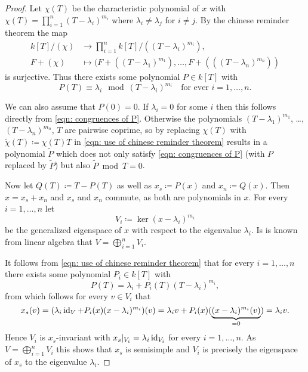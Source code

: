 \begin{proof}
 Let $\chi(T)$ be the characteristic polynomial of $x$ with $\chi(T) = \prod_{i=1}^n (T-\lambda_i)^{m_i}$ where $\lambda_i \neq \lambda_j$ for $i \neq j$. By the chinese reminder theorem the map
 \begin{equation}\label{eqn: use of chinese reminder theorem}
  \begin{aligned}
   k[T]/(\chi) &\longrightarrow \prod_{i=1}^n k[T]/((T-\lambda_i)^{m_i}),\\
   F + (\chi) &\longmapsto (F+((T-\lambda_1)^{m_1}), \dotsc, F+(((T-\lambda_n)^{m_n}))
  \end{aligned}
 \end{equation}
 is surjective. Thus there exists some polynomial $P \in k[T]$ with
 \begin{equation}\label{eqn: congruences of P}
  P(T) \equiv \lambda_i \mod (T-\lambda_i)^{m_i} \quad \text{for ever $i = 1, \dotsc, n$}.
 \end{equation}
 
 We can also assume that $P(0) = 0$. If $\lambda_i = 0$ for some $i$ then this follows directly from \eqref{eqn: congruences of P}. Otherwise the polynomials $(T-\lambda_1)^{m_1}$, \dots, $(T-\lambda_n)^{m_n}$, $T$ are pairwise coprime, so by replacing $\chi(T)$ with $\tilde{\chi}(T) \coloneqq \chi(T) T$ in \eqref{eqn: use of chinese reminder theorem} results in a polynomial $\tilde{P}$ which does not only satisfy \eqref{eqn: congruences of P} (with $P$ replaced by $\tilde{P}$) but also $\tilde{P} \bmod T = 0$.
 
 Now let $Q(T) \coloneqq T - P(T)$ as well as $x_s \coloneqq P(x)$ and $x_n \coloneqq Q(x)$. Then $x = x_s + x_n$ and $x_s$ and $x_n$ commute, as both are polynomials in $x$. For every $i = 1, \dotsc, n$ let
 \[
  V_i \coloneqq \ker (x-\lambda_i)^{m_i}
 \]
 be the generalized eigenspace of $x$ with respect to the eigenvalue $\lambda_i$. Is is known from linear algebra that $V = \bigoplus_{i=1}^n V_i$.
 
 It follows from \eqref{eqn: use of chinese reminder theorem} that for every $i = 1, \dotsc, n$ there exists some polynomial \mbox{$P_i \in k[T]$} with
 \[
  P(T) = \lambda_i + P_i(T) (T-\lambda_i)^{m_i},
 \]
 from which follows for every $v \in V_i$ that
 \[
  x_s(v)
  = (\lambda_i \operatorname{id}_V + P_i(x)(x-\lambda_i)^{m_i})(v)
  = \lambda_i v + P_i(x)(\underbrace{(x-\lambda_i)^{m_i}(v)}_{=0})
  = \lambda_i v.
 \]
 Hence $V_i$ is $x_s$-invariant with $x_s|_{V_i} = \lambda_i \operatorname{id}_{V_i}$ for every $i = 1, \dotsc, n$. As $V = \bigoplus_{i=1}^n V_i$ this shows that $x_s$ is semisimple and $V_i$ is precisely the eigenspace of $x_s$ to the eigenvalue $\lambda_i$.
 

\end{proof}

